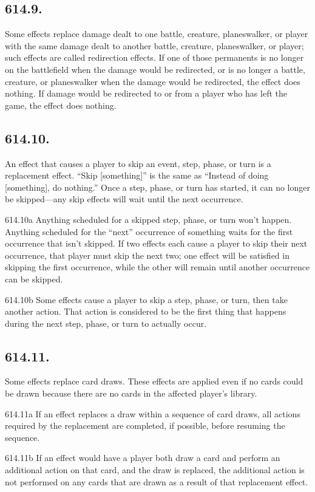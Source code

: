 \subsection*{614.9.}
Some effects replace damage dealt to one battle, creature, planeswalker, or player with the same damage dealt to another battle, creature, planeswalker, or player; such effects are called redirection effects. If one of those permanents is no longer on the battlefield when the damage would be redirected, or is no longer a battle, creature, or planeswalker when the damage would be redirected, the effect does nothing. If damage would be redirected to or from a player who has left the game, the effect does nothing.

\subsection*{614.10.}
An effect that causes a player to skip an event, step, phase, or turn is a replacement effect. “Skip [something]” is the same as “Instead of doing [something], do nothing.” Once a step, phase, or turn has started, it can no longer be skipped—any skip effects will wait until the next occurrence.

614.10a Anything scheduled for a skipped step, phase, or turn won’t happen. Anything scheduled for the “next” occurrence of something waits for the first occurrence that isn’t skipped. If two effects each cause a player to skip their next occurrence, that player must skip the next two; one effect will be satisfied in skipping the first occurrence, while the other will remain until another occurrence can be skipped.

614.10b Some effects cause a player to skip a step, phase, or turn, then take another action. That action is considered to be the first thing that happens during the next step, phase, or turn to actually occur.

\subsection*{614.11.}
Some effects replace card draws. These effects are applied even if no cards could be drawn because there are no cards in the affected player’s library.

614.11a If an effect replaces a draw within a sequence of card draws, all actions required by the replacement are completed, if possible, before resuming the sequence.

614.11b If an effect would have a player both draw a card and perform an additional action on that card, and the draw is replaced, the additional action is not performed on any cards that are drawn as a result of that replacement effect.

